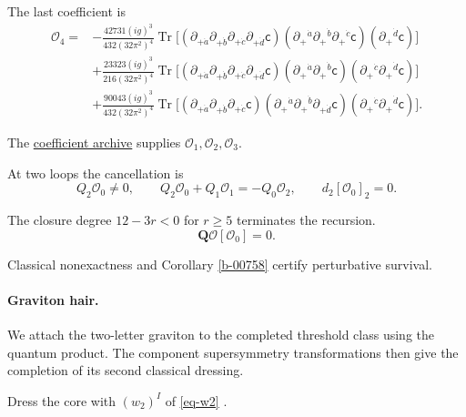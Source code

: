 \documentclass[11pt]{article}
\numberwithin{equation}{section}
\numberwithin{figure}{section}
\numberwithin{table}{section}
\begin{document}
\begin{proofbox}
The last coefficient is
\begin{equation}\label{eq-threshold-fourth}
\begin{aligned}
\mathcal O_4={}&-\frac{42731(ig)^3}{432(32\pi^2)^4}
\operatorname{Tr}\!\Big[
 (\partial_{+\dot a}\partial_{+\dot b}\partial_{+\dot c}\partial_{+\dot d}\mathsf c)
 (\partial_+{}^{\dot a}\partial_+{}^{\dot b}\partial_+{}^{\dot c}\mathsf c)
 (\partial_+{}^{\dot d}\mathsf c)\Big]\\
&+\frac{23323(ig)^3}{216(32\pi^2)^4}
\operatorname{Tr}\!\Big[
 (\partial_{+\dot a}\partial_{+\dot b}\partial_{+\dot c}\partial_{+\dot d}\mathsf c)
 (\partial_+{}^{\dot a}\partial_+{}^{\dot b}\mathsf c)
 (\partial_+{}^{\dot c}\partial_+{}^{\dot d}\mathsf c)\Big]\\
&+\frac{90043(ig)^3}{432(32\pi^2)^4}
\operatorname{Tr}\!\Big[
 (\partial_{+\dot a}\partial_{+\dot b}\partial_{+\dot c}\mathsf c)
 (\partial_+{}^{\dot a}\partial_+{}^{\dot b}\partial_{+\dot d}\mathsf c)
 (\partial_+{}^{\dot c}\partial_+{}^{\dot d}\mathsf c)\Big].
\end{aligned}
\end{equation}

The \href{https://github.com/lbotao399-stack/quantum-lifts-results}{coefficient archive} supplies $\mathcal O_1,\mathcal O_2,\mathcal O_3$.

At two loops the cancellation is
\begin{equation}\label{b-00838}
Q_2\mathcal O_0\ne0,\qquad
Q_2\mathcal O_0+Q_1\mathcal O_1=-Q_0\mathcal O_2,\qquad
 d_2[\mathcal O_0]_2=0.
\end{equation}

The closure degree $12-3r<0$ for $r\ge5$ terminates the recursion.
\begin{equation}\label{b-00840}
\mathbf Q\mathcal O[\mathcal O_0]=0.
\end{equation}

Classical nonexactness \cite[Section 3.1]{KKLP} and Corollary \ref{b-00758} certify perturbative survival.

\paragraph{Graviton hair.}\label{graviton-hair}

We attach the two-letter graviton to the completed threshold class using the quantum product. The component supersymmetry transformations then give the completion of its second classical dressing.

Dress the core with $(w_2)^I$ of \eqref{eq-w2} \cite[Eq. (3.3)]{KKLP}.


\end{proofbox}
\end{document}
